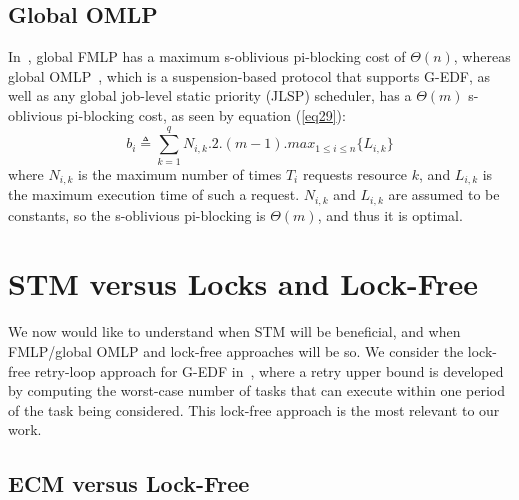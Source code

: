 \documentclass[a4paper,english]{article}
\begin{document}
\subsection{Global OMLP}


In~\cite{key-3}, 
global FMLP has a maximum s-oblivious pi-blocking cost of $\Theta(n)$, whereas global OMLP~\cite{key-3}, which is a suspension-based protocol that supports G-EDF, as well as any global job-level static priority (JLSP) scheduler, has a $\Theta(m)$ s-oblivious pi-blocking cost, as seen by equation (\ref{eq29}):
\begin{equation}
b_{i}\triangleq\sum_{k=1}^{q}N_{i,k}.2.(m-1).max_{1\le i\le n}\{L_{i,k}\}\label{eq29}\end{equation}
where $N_{i,k}$ is the maximum number of times $T_i$ requests resource $k$, and $L_{i,k}$ is the maximum execution time of such a request. $N_{i,k}$ and $L_{i,k}$ are assumed to be constants,
so the s-oblivious pi-blocking is $\Theta(m)$, and thus it is optimal.

\section{STM versus Locks and Lock-Free}
\label{sec:comparison}

We now would like to understand when STM will be beneficial, and when FMLP/global OMLP and lock-free approaches will be so. 
We consider the lock-free retry-loop approach for G-EDF in~\cite{key-5}, where a retry upper bound is developed by computing the worst-case number of tasks that can execute within one period of the task being considered. This lock-free approach is the most relevant to our work. 


\subsection{\label{sub:G-EDF-scheduler-with} ECM versus Lock-Free}
\end{document}

